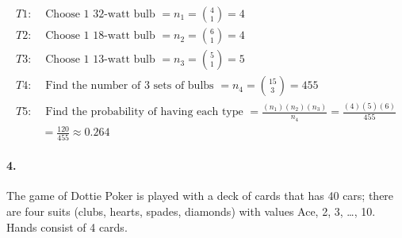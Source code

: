 \begin{enumerate}[label=(\alph*)]
        \begin{mdframed}
            \begin{align*}
                T1: & \text{ Choose 1 32-watt bulb } = n_1 = {4 \choose 1} = 4   \\
                T2: & \text{ Choose 1 18-watt bulb } = n_2 = {6 \choose 1} = 4   \\
                T3: & \text{ Choose 1 13-watt bulb } = n_3 = {5 \choose 1} = 5   \\
                T4: & \text{ Find the number of 3 sets of bulbs } = n_4 = {15 \choose 3} = 455 \\
                T5: & \text{ Find the probability of having each type } = \frac{(n_1)(n_2)(n_3)}{n_4} = \frac{(4)(5)(6)}{455}   \\
                & = \frac{120}{455} \approx \boxed{0.264}
            \end{align*}
        \end{mdframed}
    \end{enumerate}

    \pagebreak

    \paragraph*{4.}
    The game of Dottie Poker is played with a deck of cards that has 40 cars; there are four suits (clubs, hearts, spades, diamonds) with values Ace, 2, 3, \dots, 10. Hands consist of 4 cards.

